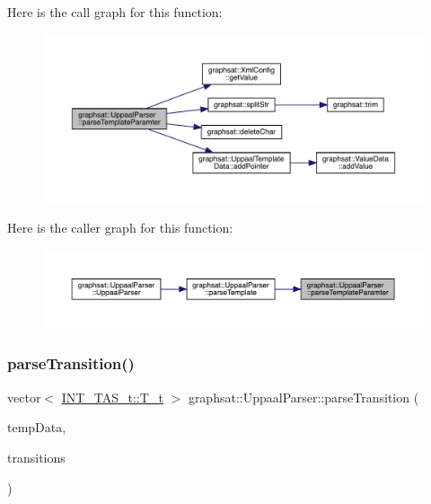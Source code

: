 Here is the call graph for this function\+:
\nopagebreak
\begin{figure}[H]
\begin{center}
\leavevmode
\includegraphics[width=350pt]{classgraphsat_1_1_uppaal_parser_ad22c12325a60e719980d25c6368a7b7c_cgraph}
\end{center}
\end{figure}
Here is the caller graph for this function\+:
\nopagebreak
\begin{figure}[H]
\begin{center}
\leavevmode
\includegraphics[width=350pt]{classgraphsat_1_1_uppaal_parser_ad22c12325a60e719980d25c6368a7b7c_icgraph}
\end{center}
\end{figure}
\mbox{\label{classgraphsat_1_1_uppaal_parser_a2d1d7098418df34e9ae1e97a23b96e1c}} 
\subsubsection{\texorpdfstring{parseTransition()}{parseTransition()}}
{\footnotesize\ttfamily vector$<$ \mbox{\hyperlink{classgraphsat_1_1_t_a_s_abbc05c03de984fb78282fd1feaf13c41}{I\+N\+T\+\_\+\+T\+A\+S\+\_\+t\+::\+T\+\_\+t}} $>$ graphsat\+::\+Uppaal\+Parser\+::parse\+Transition (\begin{DoxyParamCaption}\item[{\mbox{\hyperlink{classgraphsat_1_1_uppaal_template_data}{Uppaal\+Template\+Data}} \&}]{temp\+Data,  }\item[{\mbox{\hyperlink{namespacegraphsat_aba2f5cf076d49898cc0469bee94d3a05}{child\+\_\+type}}}]{transitions }\end{DoxyParamCaption})\hspace{0.3cm}{\ttfamily [private]}}

